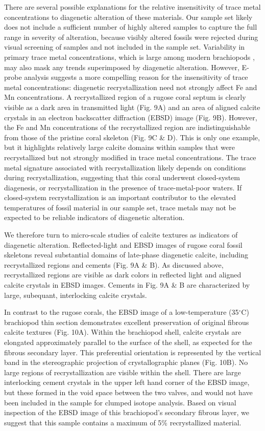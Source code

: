 \documentclass[preprint, authoryear]{elsarticle}
\begin{document}
There are several possible explanations for the relative insensitivity of trace metal concentrations to diagenetic alteration of these materials. Our sample set likely does not include a sufficient number of highly altered samples to capture the full range in severity of alteration, because visibly altered fossils were rejected during visual screening of samples and not included in the sample set. Variability in primary trace metal concentrations, which is large among modern brachiopods \citep{Brand2003}, may also mask any trends superimposed by diagenetic alteration. However, E-probe analysis suggests a more compelling reason for the insensitivity of trace metal concentrations: diagenetic recrystallization need not strongly affect Fe and Mn concentrations. A recrystallized region of a rugose coral septum is clearly visible as a dark area in transmitted light (Fig. 9A) and an area of aligned calcite crystals in an electron backscatter diffraction (EBSD) image (Fig. 9B). However, the Fe and Mn concentrations of the recrystallized region are indistinguishable from those of the pristine coral skeleton (Fig. 9C \& D). This is only one example, but it highlights relatively large calcite domains within samples that were recrystallized but not strongly modified in trace metal concentrations. The trace metal signature associated with recrystallization likely depends on conditions during recrystallization, suggesting that this coral underwent closed-system diagenesis, or recrystallization in the presence of trace-metal-poor waters. If closed-system recrystallization is an important contributor to the elevated temperatures of fossil material in our sample set, trace metals may not be expected to be reliable indicators of diagenetic alteration. 

We therefore turn to micro-scale studies of calcite textures as indicators of diagenetic alteration. Reflected-light and EBSD images of rugose coral fossil skeletons reveal substantial domains of late-phase diagenetic calcite, including recrystallized regions and cements (Fig. 9A \& B). As discussed above, recrystallized regions are visible as dark colors in reflected light and aligned calcite crystals in EBSD images. Cements in Fig. 9A \& B are characterized by large, subequant, interlocking calcite crystals. 

In contrast to the rugose corals, the EBSD image of a low-temperature (35$^{\circ}$C) brachiopod thin section demonstrates excellent preservation of original fibrous calcite textures (Fig. 10A). Within the brachiopod shell, calcite crystals are elongated approximately parallel to the surface of the shell, as expected for the fibrous secondary layer. This preferential orientation is represented by the vertical band in the stereographic projection of crystallographic planes (Fig. 10B). No large regions of recrystallization are visible within the shell. There are large interlocking cement crystals in the upper left hand corner of the EBSD image, but these formed in the void space between the two valves, and would not have been included in the sample for clumped isotope analysis. Based on visual inspection of the EBSD image of this brachiopod's secondary fibrous layer, we suggest that this sample contains a maximum of 5\% recrystallized material. 
\end{document}
